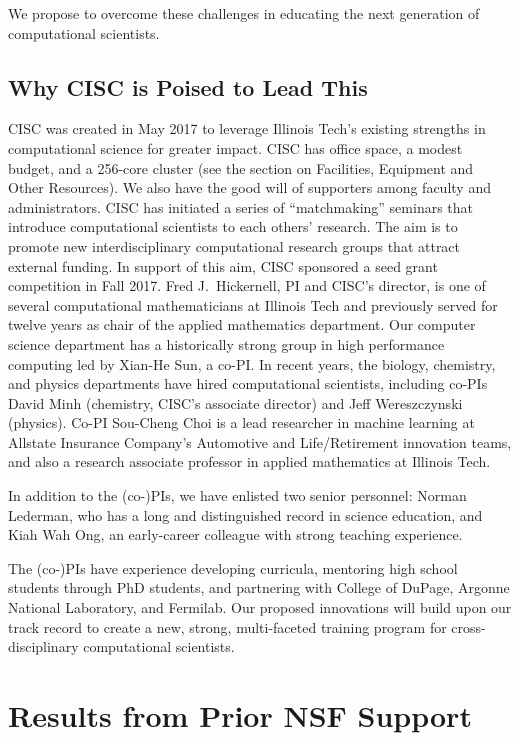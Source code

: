 \documentclass[11pt]{NSFamsart}
\begin{document}
We propose to overcome these challenges in educating the next generation of computational scientists.

\subsection*{Why CISC is Poised to Lead This}
CISC was created in May 2017 to leverage Illinois Tech's existing strengths in computational science for greater impact.  CISC has office space, a modest budget, and a 256-core cluster (see the section on Facilities, Equipment and Other Resources).  We also have the good will of supporters among faculty and administrators.  CISC has initiated a series of  ``matchmaking'' seminars that introduce computational scientists to each others' research.  The aim is to promote new interdisciplinary computational research groups that attract external funding. In support of this aim, CISC sponsored a seed grant competition in Fall 2017. Fred J.~Hickernell, PI and CISC’s director, is one of several computational mathematicians at Illinois Tech and previously served for twelve years as chair of the applied mathematics department.  Our computer science department has a historically strong group in high performance computing led by Xian-He Sun, a co-PI.  In recent years, the biology, chemistry, and physics departments have hired computational scientists, including co-PIs David Minh (chemistry, CISC's associate director) and Jeff Wereszczynski (physics).  Co-PI Sou-Cheng Choi is a lead researcher in machine learning at Allstate Insurance Company's Automotive and Life/Retirement innovation teams, and also a research associate professor in applied mathematics at Illinois Tech.

In addition to the (co-)PIs, we have enlisted two senior personnel:  Norman Lederman, who has a long and distinguished record in science education, and Kiah Wah Ong, an early-career colleague with strong teaching experience.

The (co-)PIs have experience developing curricula, mentoring high school students through PhD students, and partnering with College of DuPage, Argonne National Laboratory, and Fermilab.  Our proposed innovations will build upon our track record to create a new, strong, multi-faceted training program for cross-disciplinary computational scientists.

\section{Results from Prior NSF Support}
\end{document}
